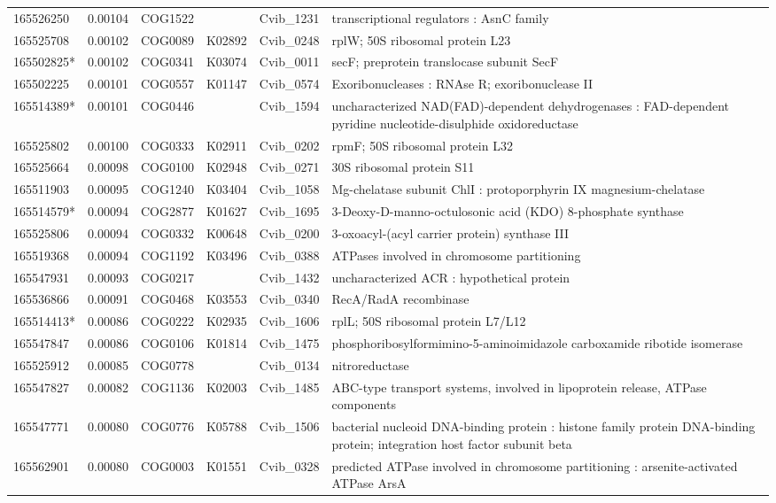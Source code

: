 \begin{landscape}
\begin{longtable}{p{1.6cm}p{1.2cm}p{1.5cm}p{1.5cm}p{2.8cm}p{13.5cm}}
165526250&0.00104&COG1522&&Cvib\_1231&transcriptional regulators : AsnC family \\
165525708&0.00102&COG0089&K02892&Cvib\_0248&rplW; 50S ribosomal protein L23 \\
165502825*&0.00102&COG0341&K03074&Cvib\_0011&secF; preprotein translocase subunit SecF \\
165502225&0.00101&COG0557&K01147&Cvib\_0574&Exoribonucleases : RNAse R; exoribonuclease II \\
165514389*&0.00101&COG0446&&Cvib\_1594&uncharacterized NAD(FAD)-dependent dehydrogenases : FAD-dependent pyridine nucleotide-disulphide oxidoreductase \\
165525802&0.00100&COG0333&K02911&Cvib\_0202&rpmF; 50S ribosomal protein L32 \\
165525664&0.00098&COG0100&K02948&Cvib\_0271&30S ribosomal protein S11 \\
165511903&0.00095&COG1240&K03404&Cvib\_1058&Mg-chelatase subunit ChlI : protoporphyrin IX magnesium-chelatase \\
165514579*&0.00094&COG2877&K01627&Cvib\_1695&3-Deoxy-D-manno-octulosonic acid (KDO) 8-phosphate synthase \\
165525806&0.00094&COG0332&K00648&Cvib\_0200&3-oxoacyl-(acyl carrier protein) synthase III \\
165519368&0.00094&COG1192&K03496&Cvib\_0388&ATPases involved in chromosome partitioning \\
165547931&0.00093&COG0217&&Cvib\_1432&uncharacterized ACR : hypothetical protein \\
165536866&0.00091&COG0468&K03553&Cvib\_0340&RecA/RadA recombinase \\
165514413*&0.00086&COG0222&K02935&Cvib\_1606&rplL; 50S ribosomal protein L7/L12 \\
165547847&0.00086&COG0106&K01814&Cvib\_1475&phosphoribosylformimino-5-aminoimidazole carboxamide ribotide isomerase \\
165525912&0.00085&COG0778&&Cvib\_0134&nitroreductase \\
165547827&0.00082&COG1136&K02003&Cvib\_1485&ABC-type transport systems, involved in lipoprotein release, ATPase components \\
165547771&0.00080&COG0776&K05788&Cvib\_1506&bacterial nucleoid DNA-binding protein : histone family protein DNA-binding protein; integration host factor subunit beta \\
165562901&0.00080&COG0003&K01551&Cvib\_0328&predicted ATPase involved in chromosome partitioning : arsenite-activated ATPase ArsA \\

\end{longtable}
\end{landscape}
